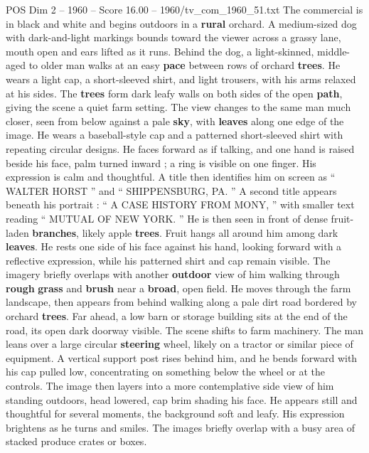 \begin{textsample}{POS Dim 2 – 1960 – Score 16.00 – 1960/tv\_com\_1960\_51.txt}  \label{ex:f2_pos_013}
The commercial is in black and white and begins outdoors in a \textbf{rural} orchard.
A medium-sized dog with dark-and-light markings bounds toward the viewer across a grassy lane, mouth open and ears lifted as it runs.
Behind the dog, a light-skinned, middle-aged to older man walks at an easy \textbf{pace} between rows of orchard \textbf{trees}.
He wears a light cap, a short-sleeved shirt, and light trousers, with his arms relaxed at his sides.
The \textbf{trees} form dark leafy walls on both sides of the open \textbf{path}, giving the scene a quiet farm setting.
The view changes to the same man much closer, seen from below against a pale \textbf{sky}, with \textbf{leaves} along one edge of the image.
He wears a baseball-style cap and a patterned short-sleeved shirt with repeating circular designs.
He faces forward as if talking, and one hand is raised beside his face, palm turned inward ; a ring is visible on one finger.
His expression is calm and thoughtful.
A title then identifies him on screen as “ WALTER HORST ” and “ SHIPPENSBURG, PA. ” A second title appears beneath his portrait : “ A CASE HISTORY FROM MONY, ” with smaller text reading “ MUTUAL OF NEW YORK. ” He is then seen in front of dense fruit-laden \textbf{branches}, likely apple \textbf{trees}.
Fruit hangs all around him among dark \textbf{leaves}.
He rests one side of his face against his hand, looking forward with a reflective expression, while his patterned shirt and cap remain visible.
The imagery briefly overlaps with another \textbf{outdoor} view of him walking through \textbf{rough} \textbf{grass} and \textbf{brush} near a \textbf{broad}, open field.
He moves through the farm landscape, then appears from behind walking along a pale dirt road bordered by orchard \textbf{trees}.
Far ahead, a low barn or storage building sits at the end of the road, its open dark doorway visible.
The scene shifts to farm machinery.
The man leans over a large circular \textbf{steering} wheel, likely on a tractor or similar piece of equipment.
A vertical support post rises behind him, and he bends forward with his cap pulled low, concentrating on something below the wheel or at the controls.
The image then layers into a more contemplative side view of him standing outdoors, head lowered, cap brim shading his face.
He appears still and thoughtful for several moments, the background soft and leafy.
His expression brightens as he turns and smiles.
The images briefly overlap with a busy area of stacked produce crates or boxes.

\end{textsample}
